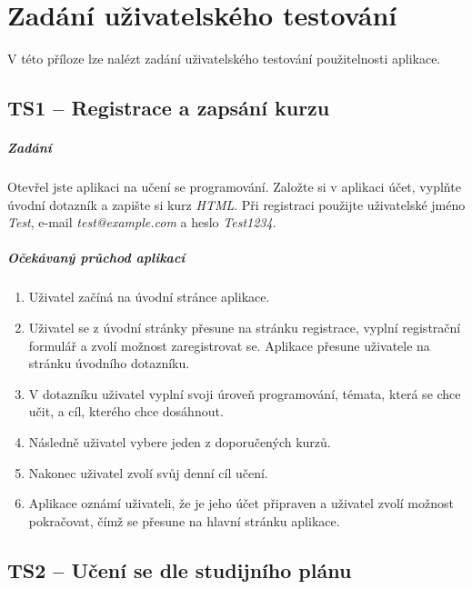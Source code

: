 \chapter{Zadání uživatelského testování}\label{chapter:test-scenarios}

V této příloze lze nalézt zadání uživatelského testování použitelnosti aplikace.

\section{TS1 -- Registrace a zapsání kurzu}

\paragraph{Zadání} Otevřel jste aplikaci na učení se programování. Založte si v aplikaci účet, vyplňte úvodní dotazník a zapište si kurz \textit{HTML}. Při registraci použijte uživatelské jméno \textit{Test}, e-mail \textit{test@example.com} a heslo \textit{Test1234}.

\paragraph{Očekávaný průchod aplikací}

\begin{enumerate}
    \item Uživatel začíná na úvodní stránce aplikace.
    \item Uživatel se z úvodní stránky přesune na stránku registrace, vyplní registrační formulář a zvolí možnost zaregistrovat se. Aplikace přesune uživatele na stránku úvodního dotazníku.
    \item V dotazníku uživatel vyplní svoji úroveň programování, témata, která se chce učit, a cíl, kterého chce dosáhnout.
    \item Následně uživatel vybere jeden z doporučených kurzů.
    \item Nakonec uživatel zvolí svůj denní cíl učení.
    \item Aplikace oznámí uživateli, že je jeho účet připraven a uživatel zvolí možnost pokračovat, čímž se přesune na hlavní stránku aplikace.
\end{enumerate}

\section{TS2 -- Učení se dle studijního plánu}

